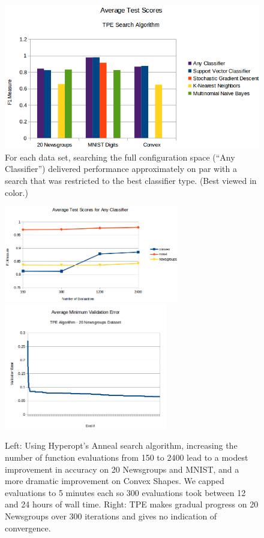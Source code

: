 \documentclass[wcp]{jmlr}
\begin{document}
\begin{figure}
    \centering
    \includegraphics[width=5.00in]{graphics/AverageTestScoresClassifiersTPE}
    \caption{
        For each data set, searching the full configuration space (``Any Classifier'') delivered performance approximately on par with a search that was restricted to the best classifier type.
        (Best viewed in color.)
    }
    \label{fig:avg_test_scores}
\end{figure}

\begin{figure}
    \centering
    \includegraphics[width=3.0in]{graphics/scores_by_classifier}
    \includegraphics[width=2.8in]{graphics/AvgMinValidErrorTPE}
    \caption{
	    Left: Using Hyperopt's Anneal search algorithm, increasing the number of function evaluations from 150 to 2400 lead to a modest improvement in accuracy on 20 Newsgroups and MNIST,
        and a more dramatic improvement on Convex Shapes.
        We capped evaluations to 5 minutes each so 300 evaluations took between 12 and 24 hours of wall time.
        Right: TPE makes gradual progress on 20 Newsgroups over 300 iterations and gives no indication of convergence.
    }
    \label{fig:per_clf}
\end{figure}
\end{document}
